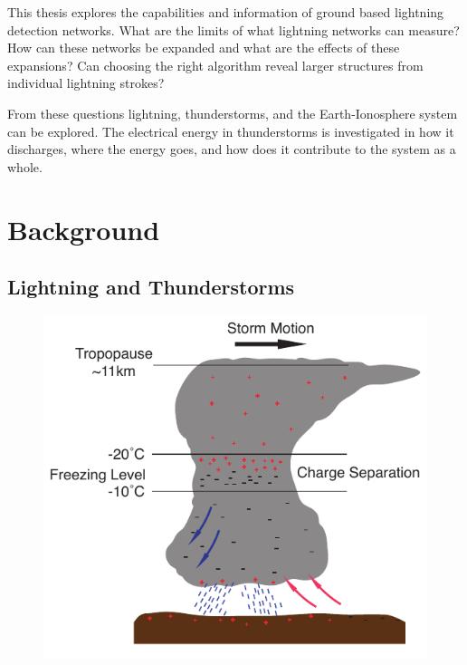 This thesis explores the capabilities and information of ground based lightning detection networks.
What are the limits of what lightning networks can measure?
How can these networks be expanded and what are the effects of these expansions?
Can choosing the right algorithm reveal larger structures from individual lightning strokes?

From these questions lightning, thunderstorms, and the Earth-Ionosphere system can be explored.
The electrical energy in thunderstorms is investigated in how it discharges, where the energy goes, and how does it contribute to the system as a whole.


\section{Background}

\subsection{Lightning and Thunderstorms}


\begin{figure}[ht!]
	\centering
	\includegraphics[scale=1]{Introduction/Figures/Thunderstorm_Structure.pdf}\\
	\caption{}
	\label{intro:fig:thunderstorm}
\end{figure}

